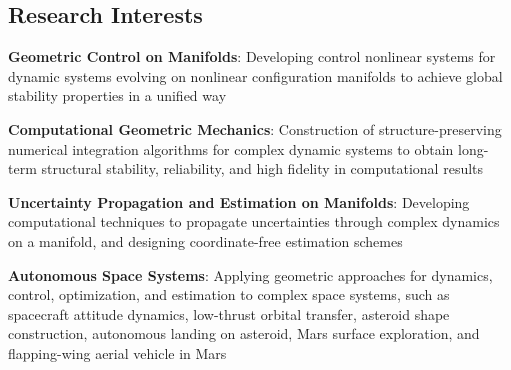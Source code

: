 \documentclass[10pt]{article}
\begin{document}
\subsection*{Research Interests}
\begin{list}{}%
{\setlength{\leftmargin}{1.0cm}\setlength{\itemindent}{-0.5cm}
\setlength{\parsep}{0cm}\setlength{\itemsep}{0.12cm}\setlength{\parskip}{0cm}\setlength{\topsep}{0cm}\setlength{\partopsep}{0cm}}

\item \textbf{Geometric Control on Manifolds}: Developing control nonlinear systems for dynamic systems evolving on nonlinear configuration manifolds to achieve global stability properties in a unified way

\item \textbf{Computational Geometric Mechanics}: Construction of structure-preserving numerical integration algorithms for complex dynamic systems to obtain long-term structural stability, reliability, and high fidelity in computational results

\item \textbf{Uncertainty Propagation and Estimation on Manifolds}: Developing computational techniques to propagate uncertainties through complex dynamics on a manifold, and designing coordinate-free estimation schemes

\vspace*{0.2cm}





\item \textbf{Autonomous Space Systems}: Applying geometric approaches for dynamics, control, optimization, and estimation to complex space systems, such as spacecraft attitude dynamics, low-thrust orbital transfer, asteroid shape construction, autonomous landing on asteroid, Mars surface exploration, and flapping-wing aerial vehicle in Mars


\end{list}
\end{document}
